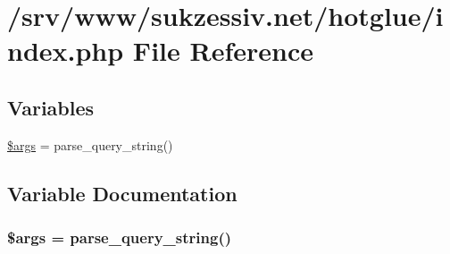 \hypertarget{index_8php}{
\section{/srv/www/sukzessiv.net/hotglue/index.php File Reference}
\label{index_8php}
}
\subsection*{Variables}
\begin{CompactItemize}
\item 
\hyperlink{index_8php_67e94494731d99ed23b123e95175bc10}{\$args} = parse\_\-query\_\-string()
\end{CompactItemize}


\subsection{Variable Documentation}
\hypertarget{index_8php_67e94494731d99ed23b123e95175bc10}{
\subsubsection[{\$args}]{\setlength{\rightskip}{0pt plus 5cm}\$args = parse\_\-query\_\-string()}}
\label{index_8php_67e94494731d99ed23b123e95175bc10}


